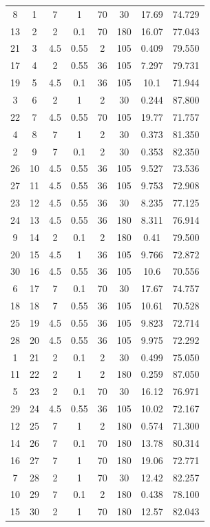 \begin{table}[H]
{\begin{tabular}{cccccccc}
			8  & 1  & 7   & 1    & 70 & 30  & 17.69 & 74.729 \\
			13 & 2  & 2   & 0.1  & 70 & 180 & 16.07 & 77.043 \\
			21 & 3  & 4.5 & 0.55 & 2  & 105 & 0.409 & 79.550 \\
			17 & 4  & 2   & 0.55 & 36 & 105 & 7.297 & 79.731 \\
			19 & 5  & 4.5 & 0.1  & 36 & 105 & 10.1  & 71.944 \\
			3  & 6  & 2   & 1    & 2  & 30  & 0.244 & 87.800 \\
			22 & 7  & 4.5 & 0.55 & 70 & 105 & 19.77 & 71.757 \\
			4  & 8  & 7   & 1    & 2  & 30  & 0.373 & 81.350 \\
			2  & 9  & 7   & 0.1  & 2  & 30  & 0.353 & 82.350 \\
			26 & 10 & 4.5 & 0.55 & 36 & 105 & 9.527 & 73.536 \\
			27 & 11 & 4.5 & 0.55 & 36 & 105 & 9.753 & 72.908 \\
			23 & 12 & 4.5 & 0.55 & 36 & 30  & 8.235 & 77.125 \\
			24 & 13 & 4.5 & 0.55 & 36 & 180 & 8.311 & 76.914 \\
			9  & 14 & 2   & 0.1  & 2  & 180 & 0.41  & 79.500 \\
			20 & 15 & 4.5 & 1    & 36 & 105 & 9.766 & 72.872 \\
			30 & 16 & 4.5 & 0.55 & 36 & 105 & 10.6  & 70.556 \\
			6  & 17 & 7   & 0.1  & 70 & 30  & 17.67 & 74.757 \\
			18 & 18 & 7   & 0.55 & 36 & 105 & 10.61 & 70.528 \\
			25 & 19 & 4.5 & 0.55 & 36 & 105 & 9.823 & 72.714 \\
			28 & 20 & 4.5 & 0.55 & 36 & 105 & 9.975 & 72.292 \\
			1  & 21 & 2   & 0.1  & 2  & 30  & 0.499 & 75.050 \\
			11 & 22 & 2   & 1    & 2  & 180 & 0.259 & 87.050 \\
			5  & 23 & 2   & 0.1  & 70 & 30  & 16.12 & 76.971 \\
			29 & 24 & 4.5 & 0.55 & 36 & 105 & 10.02 & 72.167 \\
			12 & 25 & 7   & 1    & 2  & 180 & 0.574 & 71.300 \\
			14 & 26 & 7   & 0.1  & 70 & 180 & 13.78 & 80.314 \\
			16 & 27 & 7   & 1    & 70 & 180 & 19.06 & 72.771 \\
			7  & 28 & 2   & 1    & 70 & 30  & 12.42 & 82.257 \\
			10 & 29 & 7   & 0.1  & 2  & 180 & 0.438 & 78.100 \\
			15 & 30 & 2   & 1    & 70 & 180 & 12.57 & 82.043 \\
			
			\hline
		\end{tabular}
	}
\end{table}
